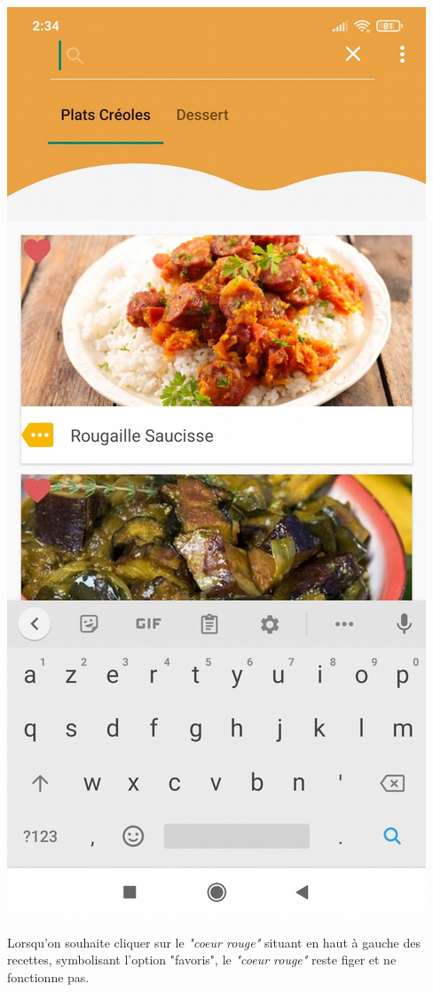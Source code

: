 \documentclass{article}
\begin{document}
\begin{center}
    \includegraphics[scale=0.2]{recherche.png} 
\end{center}

Lorsqu’on souhaite cliquer sur le \textit{"coeur rouge"} situant en haut à gauche des recettes, symbolisant l’option "favoris", le \textit{"coeur rouge"} reste figer et ne fonctionne pas.\\
\end{document}
